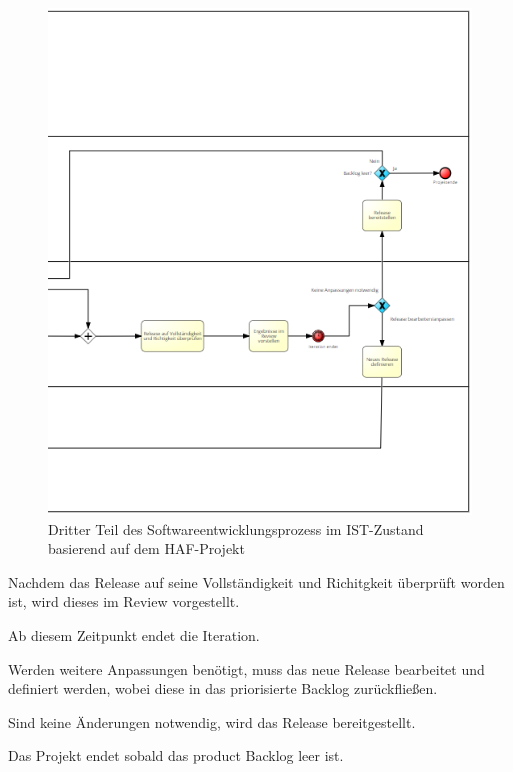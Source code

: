 \begin{figure}[h]
    \centering
    \includegraphics[scale=0.8]{Bilder/IST-Prozess_third Part.png}
    \caption{Dritter Teil des Softwareentwicklungsprozess im IST-Zustand basierend auf dem HAF-Projekt}
\end{figure}

Nachdem das Release auf seine Vollständigkeit und Richitgkeit überprüft worden ist, wird dieses im Review vorgestellt. 

Ab diesem Zeitpunkt endet die Iteration. 

Werden weitere Anpassungen benötigt, muss das neue Release bearbeitet und definiert werden, wobei diese in das priorisierte Backlog zurückfließen.

Sind keine Änderungen notwendig, wird das Release bereitgestellt. 

Das Projekt endet sobald das product Backlog leer ist.

















